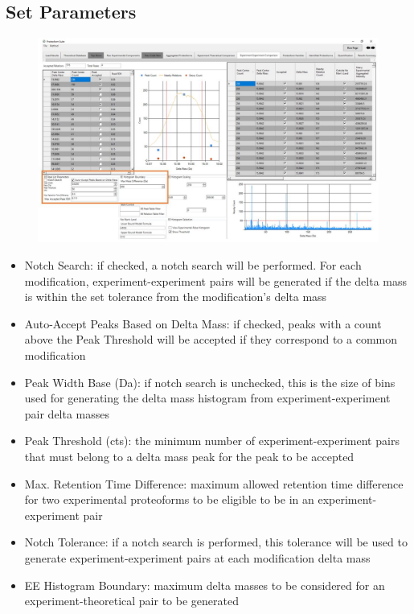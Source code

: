 \subsection{Set Parameters}
\begin{figure}[h]
\centering
\includegraphics[scale=0.43]{figures/ee1.jpg}
\end{figure}
\begin{itemize}
\item Notch Search: if checked, a notch search will be performed. For each modification, experiment-experiment pairs will be generated if the delta mass is within the set tolerance from the modification's delta mass
\item Auto-Accept Peaks Based on Delta Mass: if checked, peaks with a count above the Peak Threshold will be accepted if they correspond to a common modification
\item Peak Width Base (Da): if notch search is unchecked, this is the size of bins used for generating the delta mass histogram from experiment-experiment pair delta masses
\item Peak Threshold (cts): the minimum number of experiment-experiment pairs that must belong to a delta mass peak for the peak to be accepted
\item Max. Retention Time Difference: maximum allowed retention time difference for two experimental proteoforms to be eligible to be in an experiment-experiment pair
\item Notch Tolerance: if a notch search is performed, this tolerance will be used to generate experiment-experiment pairs at each modification delta mass
\item EE Histogram Boundary: maximum delta masses to be considered for an experiment-theoretical pair to be generated 
\end{itemize}

